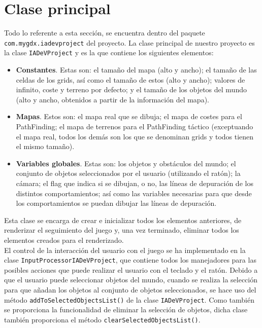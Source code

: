 \medskip
\section{Clase principal}
Todo lo referente a esta sección, se encuentra dentro del paquete \texttt{com.mygdx.iadevproject} del proyecto. La clase principal de nuestro proyecto es la clase \texttt{IADeVProject} y es la que contiene los siguientes elementos:
\begin{itemize}
 \item \textbf{Constantes}. Estas son: el tamaño del mapa (alto y ancho); el tamaño de las celdas de los grids, así como el tamaño de estos (alto y ancho); valores de infinito, coste y terreno por defecto; y el tamaño de los objetos del mundo (alto y ancho, obtenidos a partir de la información del mapa).
 \item \textbf{Mapas}. Estos son: el mapa real que se dibuja; el mapa de costes para el PathFinding; el mapa de terrenos para el PathFinding táctico (exceptuando el mapa real, todos los demás son los que se denominan grids y todos tienen el mismo tamaño).
 \item \textbf{Variables globales}. Estas son: los objetos y obstáculos del mundo; el conjunto de objetos seleccionados por el usuario (utilizando el ratón); la cámara; el flag que indica si se dibujan, o no, las líneas de depuración de los distintos comportamientos; así como las variables necesarias para que desde los comportamientos se puedan dibujar las líneas de depuración.
\end{itemize}

Esta clase se encarga de crear e inicializar todos los elementos anteriores, de renderizar el seguimiento del juego y, una vez terminado, eliminar todos los elementos creados para el renderizado. \\

El control de la interacción del usuario con el juego se ha implementado en la clase \texttt{InputProcessorIADeVProject}, que contiene todos los manejadores para las posibles acciones que puede realizar el usuario con el teclado y el ratón. Debido a que el usuario puede seleccionar objetos del mundo, cuando se realiza la selección para que añadan los objetos al conjunto de objetos seleccionados, se hace uso del método \texttt{addToSelectedObjectsList()} de la clase \texttt{IADeVProject}. Como también se proporciona la funcionalidad de eliminar la selección de objetos, dicha clase también proporciona el método \texttt{clearSelectedObjectsList()}. \\


